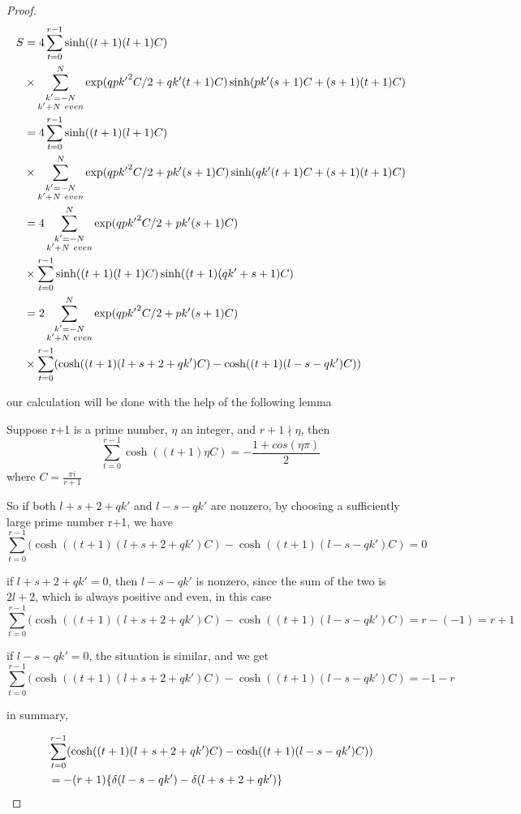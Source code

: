 \begin{proof}
\begin{align}
S&=4\sum_{t=0}^{r-1}\sinh((t+1)(l+1)C)\notag\\
&\times\sum_{ \substack {k'=-N\\ k'+N\ even}}^N  \exp(qp{k^\prime}^2C/2+qk'(t+1)C)\sinh(pk'(s+1)C+(s+1)(t+1)C)\notag\\
&=4\sum_{t=0}^{r-1}\sinh((t+1)(l+1)C)\notag\\
&\times\sum_{ \substack {k'=-N\\ k'+N\ even}}^N  \exp(qp{k^\prime}^2C/2+pk'(s+1)C)\sinh(qk'(t+1)C+(s+1)(t+1)C)\notag\\
&=4\sum_{ \substack {k'=-N\\ k'+N\ even}}^N  \exp(qp{k^\prime}^2C/2+pk'(s+1)C)\notag\\
&\times\sum_{t=0}^{r-1}\sinh((t+1)(l+1)C)\sinh((t+1)(qk'+s+1)C)\notag\\
&=2\sum_{ \substack {k'=-N\\ k'+N\ even}}^N  \exp(qp{k^\prime}^2C/2+pk'(s+1)C)\notag\\
&\times\sum_{t=0}^{r-1}(\cosh((t+1)(l+s+2+qk')C)-\cosh((t+1)(l-s-qk')C))\notag\end{align}

our calculation will be done with the help of the following lemma
\begin{lemma} Suppose r+1 is a prime number, $\eta$ an integer, and $r+1\nmid\eta$, then
\[\sum_{t=0}^{r-1}\cosh((t+1)\eta C)=-\frac{1+cos(\eta\pi)}2\]
where $C=\frac{\pi i}{r+1}$
\end{lemma}


So if both $l+s+2+qk'$ and $l-s-qk'$ are nonzero, by choosing a sufficiently large prime number r+1, we have
\[\sum_{t=0}^{r-1}(\cosh((t+1)(l+s+2+qk')C)-\cosh((t+1)(l-s-qk')C)=0\]

if $l+s+2+qk'=0$, then $l-s-qk'$ is nonzero, since the sum of the two is $2l+2$, which is always positive and even, in this case
\[\sum_{t=0}^{r-1}(\cosh((t+1)(l+s+2+qk')C)-\cosh((t+1)(l-s-qk')C)=r-(-1)=r+1\]

if $l-s-qk'=0$, the situation is similar, and we get
\[\sum_{t=0}^{r-1}(\cosh((t+1)(l+s+2+qk')C)-\cosh((t+1)(l-s-qk')C)=-1-r\]

in summary,

\begin{align} &\sum_{t=0}^{r-1}(\cosh((t+1)(l+s+2+qk')C)-\cosh((t+1)(l-s-qk')C))\notag\\
&=-(r+1)\{\delta (l-s-qk')-\delta (l+s+2+qk')\}\notag\end{align}


\end{proof}
